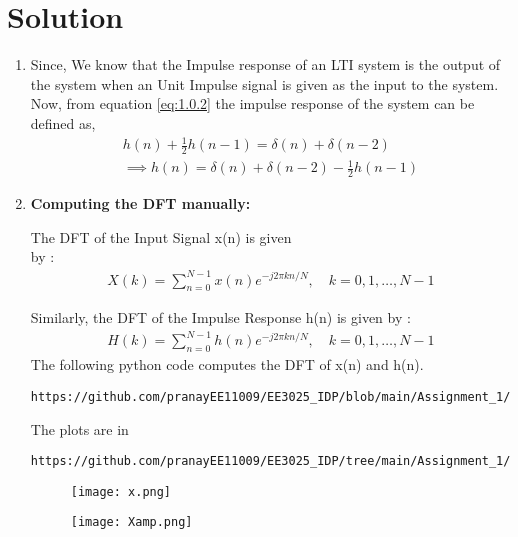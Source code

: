 \documentclass[journal,12pt,twocolumn]{IEEEtran}
\renewcommand\thesection{\arabic{section}}
\begin{document}
\section{Solution}
\begin{enumerate}[label=\thesection.\arabic*.,ref=\thesection.\theenumi]
\item
Since, We know that the Impulse response of an LTI system is the output of the system
when an Unit Impulse signal is given as the input to the system.\\

Now, from  equation \eqref{eq:1.0.2} the impulse response of the system can be defined as,
\begin{align}
    h(n) + \frac{1}{2}h(n-1) = \delta(n) + \delta(n-2)	
    \\
    \implies h(n) = \delta(n) + \delta(n-2) - \frac{1}{2}h(n-1) \label{eq:hn}
\end{align}

\item
{ \bf Computing the DFT manually:} 

The DFT of the Input Signal x(n) is given \\
by :
\begin{align}
    X(k) = \sum_{n=0}^{N-1}x(n)e^{-j2\pi kn/N},\quad k=0,1, \ldots, N-1 
\end{align}

Similarly, the DFT of the Impulse Response h(n) is given by :
\begin{align}
    H(k) = \sum_{n=0}^{N-1}h(n)e^{-j2\pi kn/N},\quad k=0,1, \ldots, N-1 
\end{align}
The following python code computes the DFT of x(n) and h(n).
\begin{lstlisting}
https://github.com/pranayEE11009/EE3025_IDP/blob/main/Assignment_1/codes/ee18btech11009.py
\end{lstlisting}
The plots are in
\begin{lstlisting}
https://github.com/pranayEE11009/EE3025_IDP/tree/main/Assignment_1/figs
\end{lstlisting}

\newpage

\begin{figure}[h!]
    \centering
    \texttt{[image: x.png]}
    \label{figs}
\end{figure}

\begin{figure}[h!]
    \centering
    \texttt{[image: Xamp.png]}
    \label{figs}
\end{figure}


\end{enumerate}
\end{document}
